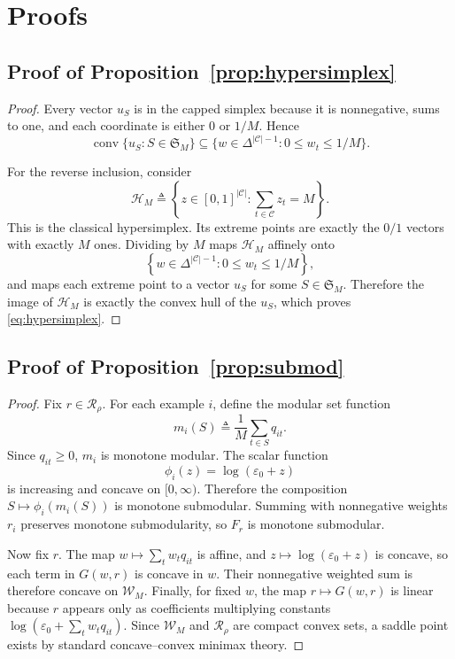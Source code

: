 \documentclass{article}
\newcommand{\cC}{\mathcal{C}}
\newcommand{\cH}{\mathcal{H}}
\newcommand{\cR}{\mathcal{R}}
\newcommand{\cW}{\mathcal{W}}
\newcommand{\simplex}{\Delta}
\newcommand{\eps}{\varepsilon}
\begin{document}
\section{Proofs}

\subsection{Proof of Proposition~\ref{prop:hypersimplex}}

\begin{proof}
Every vector \(u_S\) is in the capped simplex because it is nonnegative, sums to one, and each coordinate is either \(0\) or \(1/M\). Hence
\[
    \operatorname{conv}\{u_S:S\in\mathfrak{S}_M\}
    \subseteq
    \{w\in\simplex^{|\cC|-1}: 0\le w_t\le 1/M\}.
\]

For the reverse inclusion, consider
\[
    \cH_M
    \triangleq
    \left\{
        z\in [0,1]^{|\cC|} :
        \sum_{t\in\cC} z_t = M
    \right\}.
\]
This is the classical hypersimplex. Its extreme points are exactly the \(0/1\) vectors with exactly \(M\) ones. Dividing by \(M\) maps \(\cH_M\) affinely onto
\[
    \left\{
        w\in\simplex^{|\cC|-1}: 0\le w_t\le 1/M
    \right\},
\]
and maps each extreme point to a vector \(u_S\) for some \(S\in\mathfrak{S}_M\). Therefore the image of \(\cH_M\) is exactly the convex hull of the \(u_S\), which proves \eqref{eq:hypersimplex}.
\end{proof}

\subsection{Proof of Proposition~\ref{prop:submod}}

\begin{proof}
Fix \(r\in\cR_\rho\). For each example \(i\), define the modular set function
\[
    m_i(S)
    \triangleq
    \frac{1}{M}\sum_{t\in S} q_{it}.
\]
Since \(q_{it}\ge 0\), \(m_i\) is monotone modular. The scalar function
\[
    \phi_i(z) = \log(\eps_0 + z)
\]
is increasing and concave on \([0,\infty)\). Therefore the composition \(S\mapsto \phi_i(m_i(S))\) is monotone submodular. Summing with nonnegative weights \(r_i\) preserves monotone submodularity, so \(F_r\) is monotone submodular.

Now fix \(r\). The map \(w\mapsto \sum_t w_t q_{it}\) is affine, and \(z\mapsto \log(\eps_0+z)\) is concave, so each term in \(G(w,r)\) is concave in \(w\). Their nonnegative weighted sum is therefore concave on \(\cW_M\). Finally, for fixed \(w\), the map \(r\mapsto G(w,r)\) is linear because \(r\) appears only as coefficients multiplying constants
\(
    \log(\eps_0+\sum_t w_t q_{it}).
\)
Since \(\cW_M\) and \(\cR_\rho\) are compact convex sets, a saddle point exists by standard concave--convex minimax theory.
\end{proof}
\end{document}
